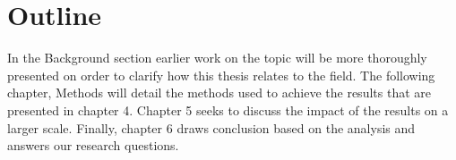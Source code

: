 \section{Outline}

In the Background section earlier work on the topic will be more thoroughly presented on order to clarify how this thesis relates to the field. The following chapter, Methods will detail the methods used to achieve the results that are presented in chapter 4. Chapter 5 seeks to discuss the impact of the results on a larger scale. Finally, chapter 6 draws conclusion based on the analysis and answers our research questions.
